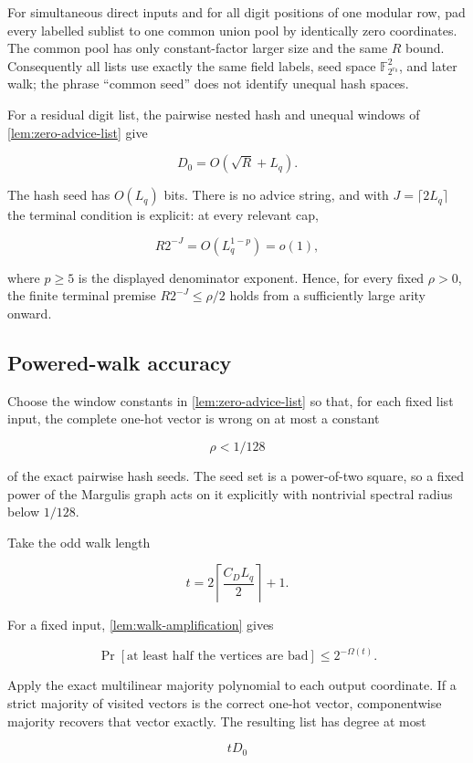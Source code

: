 \documentclass[11pt,letterpaper]{article}
\newcommand{\cref}[1]{\ref{#1}}
\theoremstyle{definition}
\theoremstyle{remark}
\begin{document}
For simultaneous direct inputs and for all digit positions of one
modular row, pad every labelled sublist to one common union pool by
identically zero coordinates. The common pool has only constant-factor
larger size and the same \(R\) bound. Consequently all lists use exactly
the same field labels, seed space \(\mathbb F_{2^{r_0}}^2\), and later
walk; the phrase ``common seed'' does not identify unequal hash spaces.

For a residual digit list, the pairwise nested hash and unequal windows
of \cref{lem:zero-advice-list} give

\[
D_0=O(\sqrt R+L_q).
\]

The hash seed has \(O(L_q)\) bits. There is no advice string, and with
\(J=\lceil2L_q\rceil\) the terminal condition is explicit: at every
relevant cap,

\[
R2^{-J}
{}={}
O\left(L_q^{1-p}\right)
=o(1),
\]

where \(p\ge5\) is the displayed denominator exponent. Hence, for every
fixed \(\rho>0\), the finite terminal premise
\(R2^{-J}\le\rho/2\) holds from a sufficiently large arity onward.

\subsection{Powered-walk accuracy}\label{a5-powered-walk-accuracy}

Choose the window constants in \cref{lem:zero-advice-list} so that, for each fixed list
input, the complete one-hot vector is wrong on at most a constant

\[
\rho<1/128
\]

of the exact pairwise hash seeds. The seed set is a power-of-two square,
so a fixed power of the Margulis graph acts on it explicitly with
nontrivial spectral radius below \(1/128\).

Take the odd walk length

\[
t=2\left\lceil\frac{C_D L_q}{2}\right\rceil+1.
\]

For a fixed input, \cref{lem:walk-amplification} gives

\[
\Pr[\text{at least half the vertices are bad}]
\le2^{-\Omega(t)}.
\]

Apply the exact multilinear majority polynomial to each output
coordinate. If a strict majority of visited vectors is the correct
one-hot vector, componentwise majority recovers that vector exactly. The
resulting list has degree at most

\[
tD_0
\]
\end{document}
